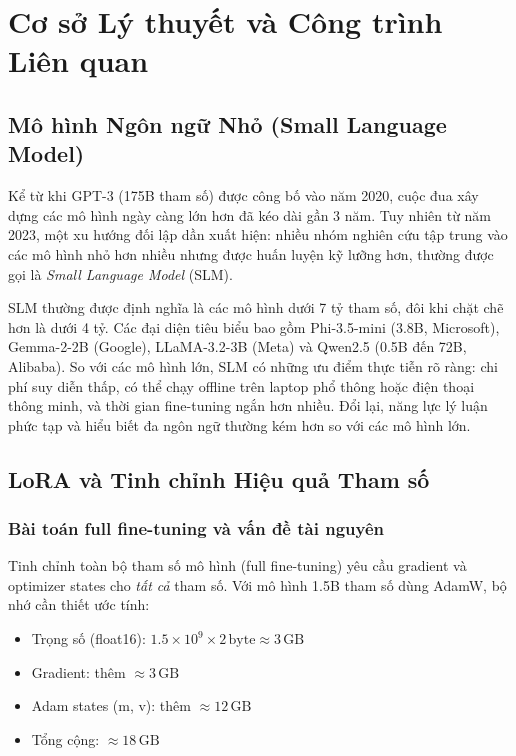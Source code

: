 \documentclass[fontsize=13pt,a4paper,oneside,DIV=calc,chapterprefix=true]{scrbook}
\begin{document}
\chapter{Cơ sở Lý thuyết và Công trình Liên quan}
\label{chap:background}

\section{Mô hình Ngôn ngữ Nhỏ (Small Language Model)}

Kể từ khi GPT-3 (175B tham số) được công bố vào năm 2020, cuộc đua xây dựng các mô hình ngày
càng lớn hơn đã kéo dài gần 3 năm. Tuy nhiên từ năm 2023, một xu hướng đối lập dần xuất hiện:
nhiều nhóm nghiên cứu tập trung vào các mô hình nhỏ hơn nhiều nhưng được huấn luyện kỹ lưỡng
hơn, thường được gọi là \textit{Small Language Model} (SLM).

SLM thường được định nghĩa là các mô hình dưới 7 tỷ tham số, đôi khi chặt chẽ hơn là dưới
4 tỷ. Các đại diện tiêu biểu bao gồm Phi-3.5-mini (3.8B, Microsoft), Gemma-2-2B (Google),
LLaMA-3.2-3B (Meta) và Qwen2.5 (0.5B đến 72B, Alibaba). So với các mô hình lớn, SLM có những
ưu điểm thực tiễn rõ ràng: chi phí suy diễn thấp, có thể chạy offline trên laptop phổ thông
hoặc điện thoại thông minh, và thời gian fine-tuning ngắn hơn nhiều. Đổi lại, năng lực lý luận
phức tạp và hiểu biết đa ngôn ngữ thường kém hơn so với các mô hình lớn.

\section{LoRA và Tinh chỉnh Hiệu quả Tham số}

\subsection{Bài toán full fine-tuning và vấn đề tài nguyên}

Tinh chỉnh toàn bộ tham số mô hình (full fine-tuning) yêu cầu gradient và optimizer states
cho \textit{tất cả} tham số. Với mô hình 1.5B tham số dùng AdamW, bộ nhớ cần thiết ước tính:
\begin{itemize}
  \item Trọng số (float16): $1.5 \times 10^9 \times 2\,\text{byte} \approx 3\,\text{GB}$
  \item Gradient: thêm $\approx 3\,\text{GB}$
  \item Adam states (m, v): thêm $\approx 12\,\text{GB}$
  \item Tổng cộng: $\approx 18\,\text{GB}$
\end{itemize}
\end{document}
